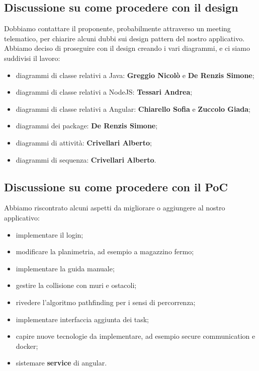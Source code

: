 \subsection{Discussione su come procedere con il design}
Dobbiamo contattare il proponente, probabilmente attraverso un meeting telematico, per chiarire alcuni dubbi sui design pattern del nostro applicativo.
Abbiamo deciso di proseguire con il design creando i vari diagrammi, e ci siamo suddivisi il lavoro:
\begin{itemize}
	\item diagrammi di classe relativi a Java: \textbf{Greggio Nicolò} e \textbf{De Renzis Simone};
	\item diagrammi di classe relativi a NodeJS: \textbf{Tessari Andrea};
	\item diagrammi di classe relativi a Angular: \textbf{Chiarello Sofia} e \textbf{Zuccolo Giada};
	\item diagrammi dei package: \textbf{De Renzis Simone};
	\item diagrammi di attività: \textbf{Crivellari Alberto};
	\item diagrammi di sequenza: \textbf{Crivellari Alberto}.
\end{itemize}

\subsection{Discussione su come procedere con il PoC}
Abbiamo riscontrato alcuni aspetti da migliorare o aggiungere al nostro applicativo:
\begin{itemize}
	\item implementare il login;
	\item modificare la planimetria, ad esempio a magazzino fermo;
	\item implementare la guida manuale;
	\item gestire la collisione con muri e ostacoli;
	\item rivedere l'algoritmo pathfinding per i sensi di percorrenza;
	\item implementare interfaccia aggiunta dei task;
	\item capire nuove tecnologie da implementare, ad esempio secure communication e docker;
	\item sistemare \textbf{service} di angular.
\end{itemize}